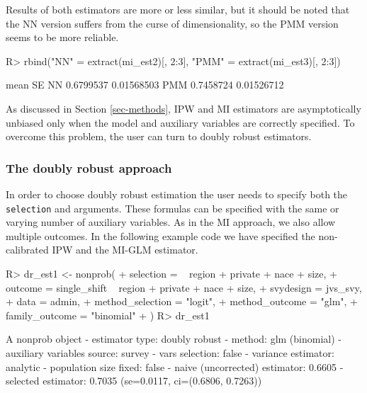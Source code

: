 \documentclass[
]{jss}
\begin{document}
Results of both estimators are more or less similar, but it should be
noted that the NN version suffers from the curse of dimensionality, so
the PMM version seems to be more reliable.

\begin{CodeChunk}
\begin{CodeInput}
R> rbind("NN" = extract(mi_est2)[, 2:3], "PMM" = extract(mi_est3)[, 2:3])
\end{CodeInput}
\begin{CodeOutput}
         mean         SE
NN  0.6799537 0.01568503
PMM 0.7458724 0.01526712
\end{CodeOutput}
\end{CodeChunk}

As discussed in Section \ref{sec-methods}, IPW and MI estimators are
asymptotically unbiased only when the model and auxiliary variables are
correctly specified. To overcome this problem, the user can turn to
doubly robust estimators.

\subsubsection{The doubly robust
approach}\label{the-doubly-robust-approach}

In order to choose doubly robust estimation the user needs to specify
both the \texttt{selection} and  arguments. These formulas
can be specified with the same or varying number of auxiliary variables.
As in the MI approach, we also allow multiple outcomes. In the following
example code we have specified the non-calibrated IPW and the MI-GLM
estimator.

\begin{CodeChunk}
\begin{CodeInput}
R> dr_est1 <- nonprob(
+   selection = ~ region + private + nace + size,
+   outcome = single_shift ~ region + private + nace + size,
+   svydesign = jvs_svy,
+   data = admin,
+   method_selection = "logit",
+   method_outcome = "glm",
+   family_outcome = "binomial"
+ )
R> dr_est1
\end{CodeInput}
\begin{CodeOutput}
A nonprob object
 - estimator type: doubly robust
 - method: glm (binomial)
 - auxiliary variables source: survey
 - vars selection: false
 - variance estimator: analytic
 - population size fixed: false
 - naive (uncorrected) estimator: 0.6605
 - selected estimator: 0.7035 (se=0.0117, ci=(0.6806, 0.7263))
\end{CodeOutput}
\end{CodeChunk}
\end{document}
